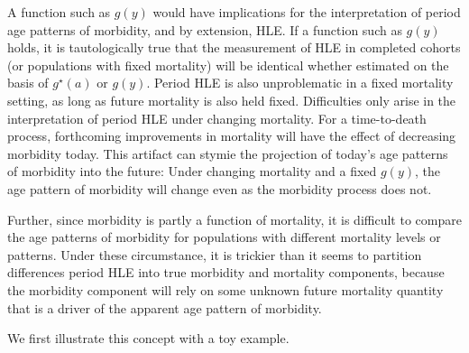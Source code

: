 \documentclass[11pt,oneside,a4paper]{article} %
\begin{document}
A function such as $g(y)$ would have implications for the interpretation of
period age patterns of morbidity, and by extension, HLE. If a function such as $g(y)$ holds, it is tautologically true that the
measurement of HLE in completed cohorts (or populations with fixed mortality)
will be identical whether estimated on the basis of $g^\star(a)$ or $g(y)$.
Period HLE is also unproblematic in a fixed mortality setting, as long as future
mortality is also held fixed. Difficulties only arise in the interpretation of
period HLE under changing mortality. For a time-to-death process, forthcoming
improvements in mortality will have the effect of decreasing morbidity today.
This artifact can stymie the projection of today's age patterns of morbidity
into the future: Under changing mortality and a fixed $g(y)$, the age pattern of
morbidity will change even as the morbidity process does not. 

Further, since morbidity is partly a function of mortality, it is difficult to
compare the age patterns of morbidity for populations with different mortality
levels or patterns. Under these circumstance, it is trickier than it seems to
partition differences period HLE into true morbidity and mortality components, because the morbidity component will rely on some unknown future mortality quantity that is a driver of the apparent age pattern of morbidity.
 
We first illustrate this concept with a toy example. 
\end{document}
